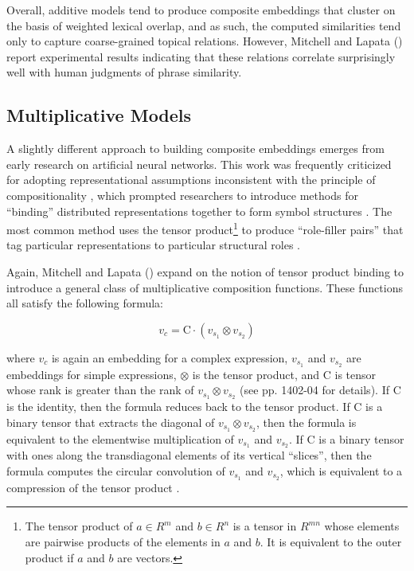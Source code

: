 Overall, additive models tend to produce composite embeddings that cluster on the basis of weighted lexical overlap, and as such, the computed similarities tend only to capture coarse-grained topical relations. However, Mitchell and Lapata (\citeyear{Mitchell:2010}) report experimental results indicating that these relations correlate surprisingly well with human judgments of phrase similarity.  

\subsection{Multiplicative Models}

A slightly different approach to building composite embeddings emerges from early research on artificial neural networks. This work was frequently criticized for adopting representational assumptions inconsistent with the principle of compositionality \citep[see e.g.,][]{FodorPylyshyn:1988}, which prompted researchers to introduce methods for ``binding'' distributed representations together to form symbol structures \citep{Smolensky:1990,Plate:1995,Gayler:2004}. The most common method uses the tensor product\footnote{The tensor product of $ a \in R^m $ and $ b \in R^n $ is a tensor in $ R^{mn} $ whose elements are pairwise products of the elements in $a$ and $b$. It is equivalent to the outer product if $a$ and $b$ are vectors.} to produce ``role-filler pairs'' that tag particular representations to particular structural roles  \citep{SmolenskyLegendre:2006}.

Again, Mitchell and Lapata (\citeyear{Mitchell:2010}) expand on the notion of tensor product binding to introduce a general class of multiplicative composition functions. These functions all satisfy the following formula: 

\begin{equation}
v_{c} = \textrm{C} \cdot (v_{s_1} \otimes  v_{s_2})
\end{equation}

\noindent
where $ v_{c} $ is again an embedding for a complex expression, $ v_{s_1} $ and $ v_{s_2} $ are embeddings for simple expressions, $ \otimes $ is the tensor product, and $ \textrm{C} $ is tensor whose rank is greater than the rank of $ v_{s_1} \otimes  v_{s_2} $ (see pp. 1402-04 for details). If $ \textrm{C} $ is the identity, then the formula reduces back to the tensor product. If $ \textrm{C} $ is a binary tensor that extracts the diagonal of $ v_{s_1} \otimes  v_{s_2} $, then the formula is equivalent to the elementwise multiplication of $ v_{s_1} $ and $ v_{s_2} $. If $ \textrm{C} $ is a binary tensor with ones along the transdiagonal elements of its vertical ``slices'', then the formula computes the circular convolution of $ v_{s_1} $ and $ v_{s_2} $, which is equivalent to a compression of the tensor product \citep{Plate:2003,Mitchell:2010}. 

